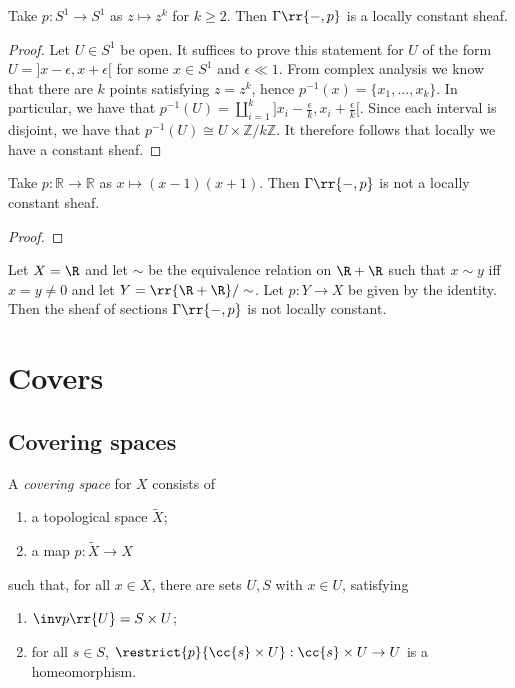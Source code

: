 \documentclass{article}
\begin{document}
\begin{example}
  Take $p:S^1 \to S^1$ as $z\mapsto z^k$ for $k\geq 2$.
  Then $\Gamma\rr{-,p}$ is a locally constant sheaf.
  \begin{proof}
    Let $U \in S^1$ be open. It suffices to prove this statement for $U$ of the form $U = ]x - \epsilon, x + \epsilon[$ for some $x \in S^1$ and $\epsilon \ll 1$. From complex analysis we know that there are $k$ points satisfying $z = z^k$, hence $p^{-1}(x) = \{x_1, ..., x_k\}$. In particular, we have that $p^{-1}(U) = \amalg_{i=1}^k ]x_i - \frac{\epsilon}{k}, x_i + \frac{\epsilon}{k}[$. Since each interval is disjoint, we have that $p^{-1}(U) \cong U \times \mathbb{Z}/k\mathbb{Z}$. It therefore follows that locally we have a constant sheaf.
    \missingproof
  \end{proof}
\end{example}

\begin{nonexample}
  Take $p: \mathbb{R} \to \mathbb{R}$ as $x \mapsto (x-1)(x+1)$.
  Then $\Gamma\rr{-,p}$ is not a locally constant sheaf.
  \begin{proof}
    \missingproof
  \end{proof}
\end{nonexample}

\begin{example}
  Let $X=\R$ and let $\sim$ be the equivalence relation on $\R+\R$ such that
  $x\sim y$ iff $x=y\neq 0$ and let $Y=\rr{\R+\R}/\sim$. Let $p:Y\to X$ be
  given by the identity. Then the sheaf of sections $\Gamma\rr{-,p}$
  is not locally constant.
\end{example}

\section{Covers}\label{sec:covering_space}

\subsection{Covering spaces}

\begin{definition}
  A \emph{covering space} for $X$ consists of
  \begin{enumerate}
    \item a topological space $\tilde X$;
    \item a map $p:\tilde X\to X$
  \end{enumerate}
  such that, for all $x\in X$, there are sets $U,S$ with $x\in U$,
  satisfying
  \begin{enumerate}
    \item $\inv p\rr{U}=S\times U$;
    \item for all $s\in S$, $\restrict{p}{\cc{s}\times U}:\cc{s}\times U\to U$ is a
      homeomorphism.
  \end{enumerate}
\end{definition}
\end{document}
